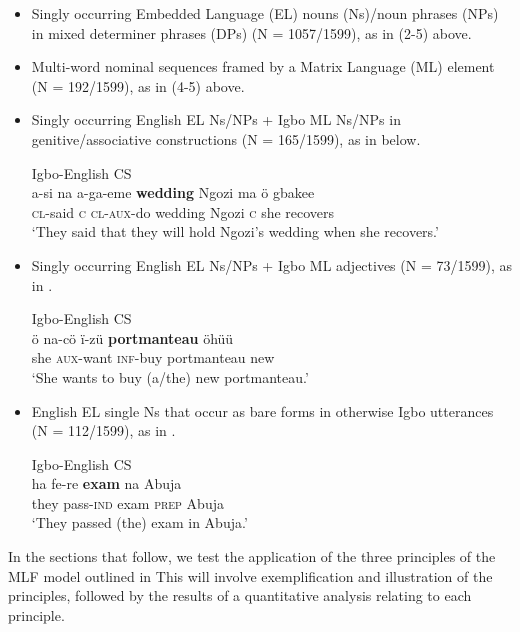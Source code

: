 \documentclass[output=paper]{langsci/langscibook}
\begin{document}
\begin{itemize}
 \item Singly occurring Embedded Language (EL) nouns (Ns)/noun phrases (NPs) in mixed determiner phrases (DPs) (N = 1057/1599), as in (2-5) above. 

 \item Multi-word nominal sequences framed by a Matrix Language (ML) element (N = 192/1599), as in (4-5) above.

 \item Singly occurring English EL Ns/NPs + Igbo ML Ns/NPs in genitive/associative constructions (N = 165/1599), as in  below.
 
\ea
{Igbo-English \textsc{CS}}\\
\gll a-si    na  a-ga-eme   \textbf{wedding}  Ngozi  ma   ö  gbakee\\
     \textsc{cl}-said  \textsc{c  cl-aux}-do  wedding  Ngozi  \textsc{c}\textsubscript{}  she  recovers\\
\glt ‘They said that they will hold Ngozi’s wedding when she recovers.’
\z

\item Singly occurring English EL Ns/NPs + Igbo ML adjectives (N = 73/1599), as in .
 

\ea
{Igbo-English \textsc{CS}}\\
\gll ö  na-cö    ï-zü    \textbf{portmanteau}  öhüü \\
     she  \textsc{aux}-want  \textsc{inf}-buy  portmanteau  new\\
\glt ‘She wants to buy (a/the) new portmanteau.’
\z
\item English EL single Ns that occur as bare forms in otherwise Igbo utterances (N = 112/1599), as in .


\ea
{Igbo-English \textsc{CS}}\\
\gll ha    fe-re    \textbf{exam}  na   Abuja\\
     they  pass-\textsc{ind}\textsubscript{}  exam  \textsc{prep}  Abuja \\
\glt ‘They passed (the) exam in Abuja.’
\z

\end{itemize}

In the sections that follow, we test the application of the three principles of the MLF model outlined in  This will involve exemplification and illustration of the principles, followed by the results of a quantitative analysis relating to each principle. 
\end{document}

